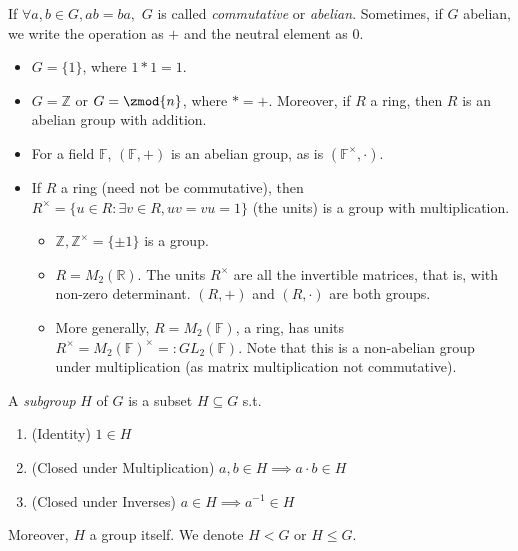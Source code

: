 \documentclass[12pt,oneside]{article}
\begin{document}
\begin{definition}\label{def:abeliangroup}
  If $\forall a, b \in G, ab = ba,$ $G$ is called \emph{commutative} or \emph{abelian}. Sometimes, if $G$ abelian, we write the operation as $+$ and the neutral element as $0$.
\end{definition}

\begin{example}
  \begin{itemize}
    \item $G = \{1\}$, where $1 \ast 1 = 1$.
    \item $G = \mathbb{Z}$ or $G = \zmod{n}$, where $\ast = +$. Moreover, if $R$ a ring, then $R$ is an abelian group with addition.
    \item For a field $\mathbb{F}$, $(\mathbb{F}, +)$ is an abelian group, as is $(\mathbb{F}^{\times}, \cdot)$.
    \item If $R$ a ring (need not be commutative), then $R^{\times} = \{u \in R : \exists v \in R, uv = vu = 1\}$ (the units) is a group with multiplication.
    
    \begin{itemize}
      \item $\mathbb{Z}, \mathbb{Z}^{\times} = \{\pm 1\}$ is a group.
      \item $R = M_2 (\mathbb{R})$. The units $R^{\times}$ are all the invertible matrices, that is, with non-zero determinant. $(R, +)$ and $(R, \cdot)$ are both groups.
      \item More generally, $R = M_2(\mathbb{F})$, a ring, has units $R^{\times} = M_2(\mathbb{F})^{\times} =: GL_2 (\mathbb{F})$. Note that this is a non-abelian group under multiplication (as matrix multiplication not commutative).
    \end{itemize}
  \end{itemize}
\end{example}

\begin{definition}[Subgroup]
  A \emph{subgroup} $H$ of $G$ is a subset $H \subseteq G$ s.t. \begin{enumerate}
    \item (Identity) $1 \in H$
    \item (Closed under Multiplication) $a, b \in H \implies a \cdot b \in H$
    \item (Closed under Inverses) $a \in H \implies a^{-1} \in H$
  \end{enumerate}
  Moreover, $H$ a group itself. We denote $H < G$ or $H \leqslant G$.
\end{definition}
\end{document}
